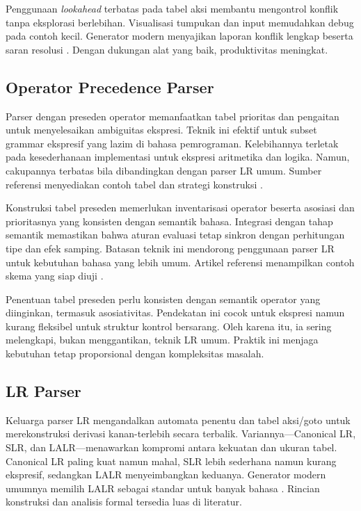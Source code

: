 \documentclass[../main.tex]{subfiles}
\begin{document}
Penggunaan \emph{lookahead} terbatas pada tabel aksi membantu mengontrol konflik tanpa eksplorasi berlebihan. Visualisasi tumpukan dan input memudahkan debug pada contoh kecil. Generator modern menyajikan laporan konflik lengkap beserta saran resolusi \citep{BisonManual}. Dengan dukungan alat yang baik, produktivitas meningkat.

\subsection{Operator Precedence Parser}
Parser dengan preseden operator memanfaatkan tabel prioritas dan pengaitan untuk menyelesaikan ambiguitas ekspresi. Teknik ini efektif untuk subset grammar ekspresif yang lazim di bahasa pemrograman. Kelebihannya terletak pada kesederhanaan implementasi untuk ekspresi aritmetika dan logika. Namun, cakupannya terbatas bila dibandingkan dengan parser LR umum. Sumber referensi menyediakan contoh tabel dan strategi konstruksi \citep{WikiOperatorPrecedence}.

Konstruksi tabel preseden memerlukan inventarisasi operator beserta asosiasi dan prioritasnya yang konsisten dengan semantik bahasa. Integrasi dengan tahap semantik memastikan bahwa aturan evaluasi tetap sinkron dengan perhitungan tipe dan efek samping. Batasan teknik ini mendorong penggunaan parser LR untuk kebutuhan bahasa yang lebih umum. Artikel referensi menampilkan contoh skema yang siap diuji \citep{WikiOperatorPrecedence}.

Penentuan tabel preseden perlu konsisten dengan semantik operator yang diinginkan, termasuk asosiativitas. Pendekatan ini cocok untuk ekspresi namun kurang fleksibel untuk struktur kontrol bersarang. Oleh karena itu, ia sering melengkapi, bukan menggantikan, teknik LR umum. Praktik ini menjaga kebutuhan tetap proporsional dengan kompleksitas masalah.

\subsection{LR Parser}
Keluarga parser LR mengandalkan automata penentu dan tabel aksi/goto untuk merekonstruksi derivasi kanan-terlebih secara terbalik. Variannya—Canonical LR, SLR, dan LALR—menawarkan kompromi antara kekuatan dan ukuran tabel. Canonical LR paling kuat namun mahal, SLR lebih sederhana namun kurang ekspresif, sedangkan LALR menyeimbangkan keduanya. Generator modern umumnya memilih LALR sebagai standar untuk banyak bahasa \citep{WikiLR}. Rincian konstruksi dan analisis formal tersedia luas di literatur.
\end{document}
